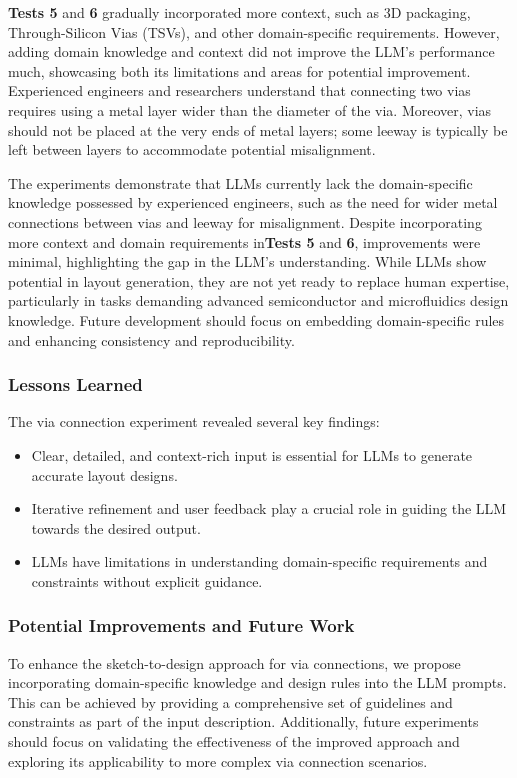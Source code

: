 \documentclass{article}
\begin{document}
\textbf{Tests 5} and \textbf{6} gradually incorporated more context, such as 3D packaging, Through-Silicon Vias (TSVs), and other domain-specific requirements. However, adding domain knowledge and context did not improve the LLM's performance much, showcasing both its limitations and areas for potential improvement. Experienced engineers and researchers understand that connecting two vias requires using a metal layer wider than the diameter of the via. Moreover, vias should not be placed at the very ends of metal layers; some leeway is typically be left between layers to accommodate potential misalignment.

The experiments demonstrate that LLMs currently lack the domain-specific knowledge possessed by experienced engineers, such as the need for wider metal connections between vias and leeway for misalignment. Despite incorporating more context and domain requirements in\textbf{Tests 5} and \textbf{6}, improvements were minimal, highlighting the gap in the LLM's understanding. While LLMs show potential in layout generation, they are not yet ready to replace human expertise, particularly in tasks demanding advanced semiconductor and microfluidics design knowledge. Future development should focus on embedding domain-specific rules and enhancing consistency and reproducibility.



\subsubsection{Lessons Learned}
The via connection experiment revealed several key findings:
\begin{itemize}
\item Clear, detailed, and context-rich input is essential for LLMs to generate accurate layout designs.
\item Iterative refinement and user feedback play a crucial role in guiding the LLM towards the desired output.
\item LLMs have limitations in understanding domain-specific requirements and constraints without explicit guidance.
\end{itemize}
\subsubsection{Potential Improvements and Future Work}
To enhance the sketch-to-design approach for via connections, we propose incorporating domain-specific knowledge and design rules into the LLM prompts. This can be achieved by providing a comprehensive set of guidelines and constraints as part of the input description. Additionally, future experiments should focus on validating the effectiveness of the improved approach and exploring its applicability to more complex via connection scenarios.
\end{document}
